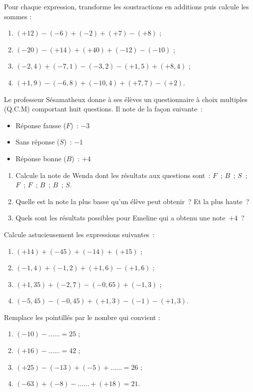 \begin{exercice}
Pour chaque expression, transforme les soustractions en additions puis calcule les sommes :
\begin{enumerate}
 \item $(+ 12) - (- 6) + (- 2) + (+ 7) - (+ 8)$ ;
 \item $(- 20) - (+ 14) + (+ 40) + (- 12) - (- 10)$ ;
 \item $(- 2,4) + (- 7,1) - (- 3,2) - (+ 1,5) + (+ 8,4)$ ;
 \item $(+ 1,9) - (- 6,8) + (- 10,4) + (+ 7,7) - (+ 2)$.
 \end{enumerate}
\end{exercice}


\begin{exercice}
Le professeur Sésamatheux donne à ses élèves un questionnaire à choix multiples (Q.C.M) comportant huit questions. Il note de la façon suivante :
\begin{itemize}
 \item Réponse fausse ($F$) : $- 3$
 \item Sans réponse ($S$) : $- 1$
 \item Réponse bonne ($B$) : $+ 4$
 \end{itemize}
 \begin{enumerate}
 \item Calcule la note de Wenda dont les résultats aux questions sont : $F$ ; $B$ ; $S$ ; $F$ ; $F$ ; $B$ ; $B$ ; $S$. 
 \item Quelle est la note la plus basse qu'un élève peut obtenir ? Et la plus haute ?
 \item Quels sont les résultats possibles pour Emeline qui a obtenu une note $+ 4$ ?
 \end{enumerate}
\end{exercice}


\begin{exercice}
Calcule astucieusement les expressions suivantes :
\begin{enumerate}
 \item $(+ 14) + (- 45) + (- 14) + (+ 15)$ ;
 \item $(- 1,4) + (- 1,2) + (+ 1,6) - (+ 1,6)$ ;
 \item $(+ 1,35) + (- 2,7) - (- 0,65) + (- 1,3)$ ;
 \item $(- 5,45) - (- 0,45) + (+ 1,3) - (- 1) - (+ 1,3)$.
 \end{enumerate}
\end{exercice}


\begin{exercice}
Remplace les pointillés par le nombre qui convient :
\begin{enumerate}
 \item $(- 10) - \ldots \ldots  = 25$ ;
 \item $(+ 16) - \ldots \ldots  = 42$ ;
 \item $(+ 25) - (- 13) + (- 5) + \ldots \ldots = 26$ ;
 \item $(- 63) + (- 8) - \ldots \ldots + (+ 18) = 21$.
 \end{enumerate}
\end{exercice}


